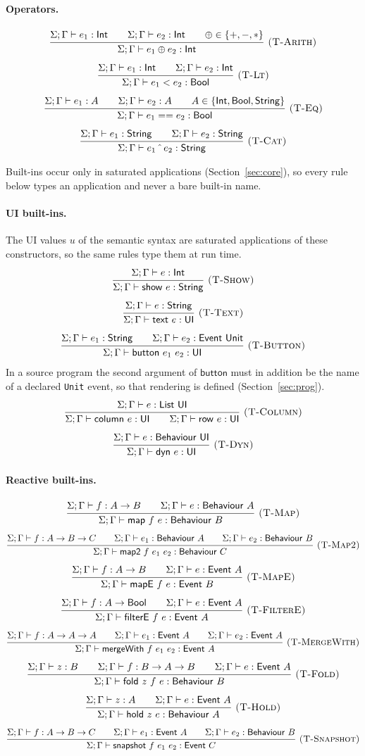 \documentclass{article}
\makeatletter
\newcommand{\kw}[1]{\mathsf{#1}}
\newcommand{\rul}[3]{\[\dfrac{\begin{array}{@{}c@{}}#2\end{array}}{\begin{array}{@{}c@{}}#3\end{array}}\ \textsc{#1}\]}
\newcommand{\tj}{\Sigma;\Gamma \vdash}   %
\makeatother
\begin{document}
\paragraph{Operators.}
\rul{(T-Arith)}{\tj e_1 : \kw{Int} \qquad \tj e_2 : \kw{Int} \qquad \oplus \in \{+,-,*\}}{\tj e_1 \oplus e_2 : \kw{Int}}
\rul{(T-Lt)}{\tj e_1 : \kw{Int} \qquad \tj e_2 : \kw{Int}}{\tj e_1 < e_2 : \kw{Bool}}
\rul{(T-Eq)}{\tj e_1 : A \qquad \tj e_2 : A \qquad A \in \{\kw{Int},\kw{Bool},\kw{String}\}}{\tj e_1 == e_2 : \kw{Bool}}
\rul{(T-Cat)}{\tj e_1 : \kw{String} \qquad \tj e_2 : \kw{String}}{\tj e_1 \mathbin{\hat{\ }} e_2 : \kw{String}}

\noindent Built-ins occur only in saturated applications (Section~\ref{sec:core}), so every rule below types an application and never a bare built-in name.

\paragraph{UI built-ins.} The UI values $u$ of the semantic syntax are saturated applications of these
constructors, so the same rules type them at run time.
\rul{(T-Show)}{\tj e : \kw{Int}}{\tj \kw{show}\ e : \kw{String}}
\rul{(T-Text)}{\tj e : \kw{String}}{\tj \kw{text}\ e : \kw{UI}}
\rul{(T-Button)}{\tj e_1 : \kw{String} \qquad \tj e_2 : \kw{Event}\ \kw{Unit}}{\tj \kw{button}\ e_1\ e_2 : \kw{UI}}
\noindent In a source program the second argument of $\kw{button}$ must in addition be the name of a declared \texttt{Unit} event, so that rendering is defined (Section~\ref{sec:prog}).
\rul{(T-Column)}{\tj e : \kw{List}\ \kw{UI}}{\tj \kw{column}\ e : \kw{UI} \qquad \tj \kw{row}\ e : \kw{UI}}
\rul{(T-Dyn)}{\tj e : \kw{Behaviour}\ \kw{UI}}{\tj \kw{dyn}\ e : \kw{UI}}

\paragraph{Reactive built-ins.}
\rul{(T-Map)}{\tj f : A \to B \qquad \tj e : \kw{Behaviour}\ A}{\tj \kw{map}\ f\ e : \kw{Behaviour}\ B}
\rul{(T-Map2)}{\tj f : A \to B \to C \qquad \tj e_1 : \kw{Behaviour}\ A \qquad \tj e_2 : \kw{Behaviour}\ B}
{\tj \kw{map2}\ f\ e_1\ e_2 : \kw{Behaviour}\ C}
\rul{(T-MapE)}{\tj f : A \to B \qquad \tj e : \kw{Event}\ A}{\tj \kw{mapE}\ f\ e : \kw{Event}\ B}
\rul{(T-FilterE)}{\tj f : A \to \kw{Bool} \qquad \tj e : \kw{Event}\ A}{\tj \kw{filterE}\ f\ e : \kw{Event}\ A}
\rul{(T-MergeWith)}{\tj f : A \to A \to A \qquad \tj e_1 : \kw{Event}\ A \qquad \tj e_2 : \kw{Event}\ A}
{\tj \kw{mergeWith}\ f\ e_1\ e_2 : \kw{Event}\ A}
\rul{(T-Fold)}{\tj z : B \qquad \tj f : B \to A \to B \qquad \tj e : \kw{Event}\ A}
{\tj \kw{fold}\ z\ f\ e : \kw{Behaviour}\ B}
\rul{(T-Hold)}{\tj z : A \qquad \tj e : \kw{Event}\ A}{\tj \kw{hold}\ z\ e : \kw{Behaviour}\ A}
\rul{(T-Snapshot)}{\tj f : A \to B \to C \qquad \tj e_1 : \kw{Event}\ A \qquad \tj e_2 : \kw{Behaviour}\ B}
{\tj \kw{snapshot}\ f\ e_1\ e_2 : \kw{Event}\ C}
\end{document}
